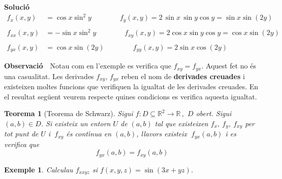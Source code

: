 \documentclass[12pt]{article}
\newcommand{\observacio}{\textbf{Observaci{\'o}}\ \ }
\newcommand{\solucio}{\textbf{Soluci{\'o}}\ \ }
\newtheorem{definicio}{Definici{\'o}}[subsection]
\newtheorem{teorema}{Teorema}[subsection]
\newtheorem{exemple}{Exemple}[subsection]
\newcommand{\R}{\mathbb{R}}
\begin{document}
\solucio
\begin{align*}
f_x(x,y) &  = \cos x \sin^2 y\qquad\qquad f_y(x,y)  = 2\,\sin x\,\sin y \cos y = \sin x \sin (2 y) \\
&\\
f_{xx}(x,y) &  = -\sin x \sin^2 y  \qquad\qquad f_{xy}(x,y)   = 2\cos x \sin y \cos y = \cos x \sin (2y) \\
&\\
f_{yx}(x,y) &  =  \cos x \sin (2y)  \qquad\qquad f_{yy}(x,y)  = 2\sin x \cos (2y)
\end{align*}


\vspace{0.4cm}
\observacio Notau com en l'exemple es verifica que $f_{xy}=f_{yx}$. Aquest fet no {\'e}s una casualitat. Les derivades
$f_{xy}$, $f_{yx}$ reben el nom de \textbf{derivades creuades} i existeixen moltes funcions que verifiquen la igualtat de les derivades creuades. En el resultat seg{\"u}ent veurem  respecte quines condicions  es verifica aquesta igualtat.

\vspace{0.4cm}
\begin{teorema}[Teorema de Schwarz]
Sigui $f:D \subseteq \R^{2} \longrightarrow \R\,,$ $D$ obert. Sigui $(a,b)\in D$. Si existeix un entorn $U$ de $(a,b)$ tal que existeixen $f_x,\ f_y,\ f_{xy}$ per tot punt de $U$ i $\ f_{xy}$ {\'e}s cont{\'\i}nua en $(a,b)$, llavors
existeix $ \ f_{yx}(a,b)$ i es verifica que
$$
f_{yx}(a,b)=f_{xy}(a,b)
$$
\end{teorema}


%
%


\vspace{0.4cm}
\begin{exemple}
Calculau $f_{xxyz}$ si $f(x,y,z)=\sin (3x+yz)$.
\end{exemple}
\end{document}
